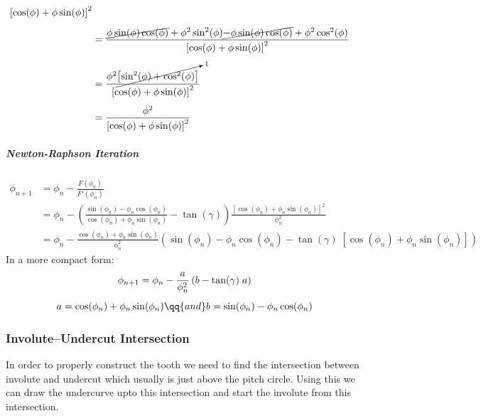 \begin{enumerate}[label=\alph*)]
\begin{subequations}
\begin{align}
{                    }
                    {\left[\cos(\phi) + \phi\sin(\phi)\right]^2}\\[1ex]
                &= \frac{
                    \cancel{\phi\sin(\phi)\cos(\phi)} + \phi^2\sin^2(\phi) \cancel{ -\phi\sin(\phi)\cos(\phi)} + \phi^2\cos^2(\phi)
                    }
                    {\left[\cos(\phi) + \phi\sin(\phi)\right]^2}\\[1ex]
                &= \frac{
                    \phi^2\cancelto{1}{\left[\sin^2(\phi) + \cos^2(\phi)\right]}
                    }
                    {\left[\cos(\phi) + \phi\sin(\phi)\right]^2}\\[1ex]
                &= \frac{\phi^2}{\left[\cos(\phi) + \phi\sin(\phi)\right]^2}
        \end{align}
        \end{subequations}
\end{enumerate}

\subparagraph{Newton-Raphson Iteration}
\begin{subequations}
\begin{align}
    \phi_{n+1}  &= \phi_n - \frac{F(\phi_n)}{F'(\phi_n)} \\
                &= \phi_n - \left(\frac{\sin(\phi_n) - \phi_n\cos(\phi_n)}{\cos(\phi_n) + \phi_n\sin(\phi_n)} - \tan(\gamma)\right)
                    \frac{\left[\cos(\phi_n) + \phi_n\sin(\phi_n)\right]^2}{\phi_n^2}\\[1ex]
                &= \phi_n - \frac{\cos(\phi_n) + \phi_n\sin(\phi_n)}{\phi_n^2}\left(\sin(\phi_n) 
                    -\phi_n\cos(\phi_n) - \tan(\gamma)\;\left[\cos(\phi_n) + \phi_n\sin(\phi_n)\right]\right)
\end{align}
\end{subequations}
In a more compact form:
\begin{equation}
    \begin{gathered}
        \phi_{n+1} = \phi_n - \frac{a}{\phi_n^2}\left(b - \tan(\gamma)\;a\right)\\[1ex]
        a =\cos(\phi_n) + \phi_n\sin(\phi_n) \qq{and} b=\sin(\phi_n) - \phi_n\cos(\phi_n)
    \end{gathered}
\end{equation}


\subsubsection{Involute--Undercut Intersection}
In order to properly construct the tooth we need to find the intersection between involute and undercut which usually is just above the pitch circle. Using this we can draw the undercurve upto this intersection and start the involute from this intersection.
